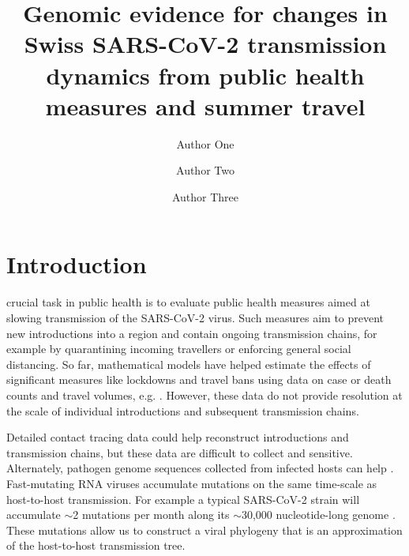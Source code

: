 \documentclass[9pt,twoside,lineno]{pnas-new} %
\title{Genomic evidence for changes in Swiss SARS-CoV-2 transmission dynamics from public health measures and summer travel}
\author[a,c,1]{Author One}
\author[b,1,2]{Author Two}
\author[a]{Author Three}
\affil[a]{Affiliation One}
\affil[b]{Affiliation Two}
\affil[c]{Affiliation Three}
\begin{document}
\maketitle
\thispagestyle{firststyle}



\section{Introduction}

 crucial task in public health is to evaluate public health measures aimed at slowing transmission of the SARS-CoV-2 virus. Such measures aim to prevent new introductions into a region and contain ongoing transmission chains, for example by quarantining incoming travellers or enforcing general social distancing. So far, mathematical models have helped estimate the effects of significant measures like lockdowns and travel bans using data on case or death counts and travel volumes, e.g. \cite{Flaxman2020, Tian2020}. However, these data do not provide resolution at the scale of individual introductions and subsequent transmission chains.

Detailed contact tracing data could help reconstruct introductions and transmission chains, but these data are difficult to collect and sensitive. Alternately, pathogen genome sequences collected from infected hosts can help \cite{Kraemer}. Fast-mutating RNA viruses accumulate mutations on the same time-scale as host-to-host transmission. For example a typical SARS-CoV-2 strain will accumulate $\sim$2 mutations per month along its $\sim$30,000 nucleotide-long genome \cite{Nextstrainteam}. These mutations allow us to construct a viral phylogeny that is an approximation of the host-to-host transmission tree. 
\end{document}

